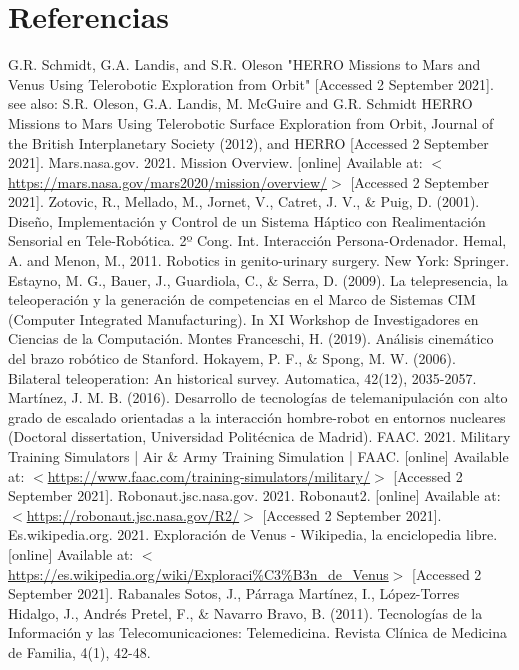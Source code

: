 \chapter{Referencias}
\begin{thebibliography}{2}
	 G.R. Schmidt, G.A. Landis, and S.R. Oleson "HERRO Missions to Mars and Venus Using Telerobotic Exploration from Orbit" [Accessed 2 September 2021]. see also: S.R. Oleson, G.A. Landis, M. McGuire and G.R. Schmidt HERRO Missions to Mars Using Telerobotic Surface Exploration from Orbit, Journal of the British Interplanetary Society (2012), and HERRO  [Accessed 2 September 2021].
	 Mars.nasa.gov. 2021. Mission Overview. [online] Available at: $<$\url{https://mars.nasa.gov/mars2020/mission/overview/}$>$ [Accessed 2 September 2021].
	 Zotovic, R., Mellado, M., Jornet, V., Catret, J. V., \& Puig, D. (2001). Diseño, Implementación y Control de un Sistema Háptico con Realimentación Sensorial en Tele-Robótica. 2º Cong. Int. Interacción Persona-Ordenador.
	 Hemal, A. and Menon, M., 2011. Robotics in genito-urinary surgery. New York: Springer.
	 Estayno, M. G., Bauer, J., Guardiola, C., \& Serra, D. (2009). La telepresencia, la teleoperación y la generación de competencias en el Marco de Sistemas CIM (Computer Integrated Manufacturing). In XI Workshop de Investigadores en Ciencias de la Computación.
	 Montes Franceschi, H. (2019). Análisis cinemático del brazo robótico de Stanford.
	 Hokayem, P. F., \& Spong, M. W. (2006). Bilateral teleoperation: An historical survey. Automatica, 42(12), 2035-2057.
	 Martínez, J. M. B. (2016). Desarrollo de tecnologías de telemanipulación con alto grado de escalado orientadas a la interacción hombre-robot en entornos nucleares (Doctoral dissertation, Universidad Politécnica de Madrid).
	 FAAC. 2021. Military Training Simulators | Air \& Army Training Simulation | FAAC. [online] Available at: $<$\url{https://www.faac.com/training-simulators/military/}$>$ [Accessed 2 September 2021].
	 Robonaut.jsc.nasa.gov. 2021. Robonaut2. [online] Available at: $<$\url{https://robonaut.jsc.nasa.gov/R2/}$>$ [Accessed 2 September 2021].
	 Es.wikipedia.org. 2021. Exploración de Venus - Wikipedia, la enciclopedia libre. [online] Available at: $<$\url{https://es.wikipedia.org/wiki/Exploraci\%C3\%B3n\_de\_Venus}$>$ [Accessed 2 September 2021].
	 Rabanales Sotos, J., Párraga Martínez, I., López-Torres Hidalgo, J., Andrés Pretel, F., \& Navarro Bravo, B. (2011). Tecnologías de la Información y las Telecomunicaciones: Telemedicina. Revista Clínica de Medicina de Familia, 4(1), 42-48.

\end{thebibliography}
